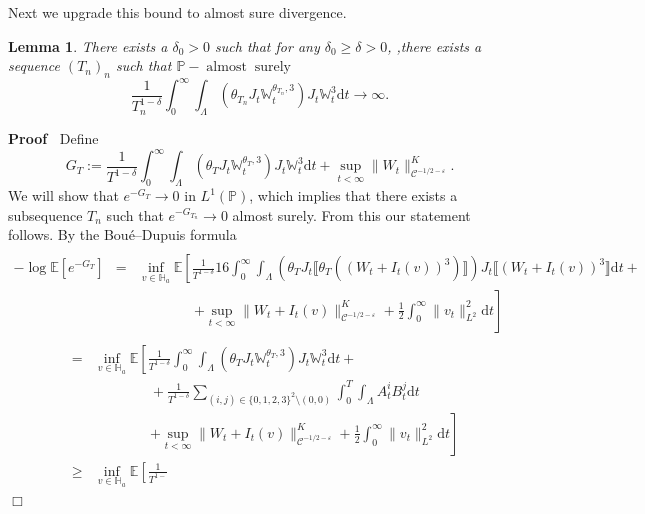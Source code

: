 \documentclass[11pt]{article}
\newcommand{\assign}{:=}
\newcommand{\mathd}{\mathrm{d}}
\newcommand{\tmop}[1]{\ensuremath{\operatorname{#1}}}
\newenvironment{proof}{\noindent\textbf{Proof\ }}{\hspace*{\fill}$\Box$\medskip}
\newtheorem{lemma}{Lemma}
\newcommand{\VV}{\mathscr{C}}
\begin{document}
Next we upgrade this bound to almost sure divergence.

\begin{lemma}
  There exists a $\delta_0 > 0$ such that for any $\delta_0 \geqslant \delta >
  0$, ,there exists a sequence $(T_n)_n$ such that $\mathbb{P}- \tmop{almost}
  \tmop{surely}$
  \[ \frac{1}{T_n^{1 - \delta}} \int^{\infty}_0 \int_{\Lambda} \left(
     \theta_{T_n} J_t \mathbb{W}_t^{\theta_{T_n}, 3} \right) J_t
     \mathbb{W}_t^3 \mathd t \rightarrow \infty . \]
\end{lemma}

\begin{proof}
  Define
  \[ G_T \assign \frac{1}{T^{1 - \delta}} \int^{\infty}_0 \int_{\Lambda}
     (\theta_T J_t \mathbb{W}_t^{\theta_T, 3}) J_t \mathbb{W}_t^3 \mathd t +
     \sup_{t < \infty} \| W_t \|^K_{\VV^{- 1 / 2 - \varepsilon}} . \]
  We will show that $e^{- G_T} \rightarrow 0$ in $L^1 (\mathbb{P})$, which
  implies that there exists a subsequence $T_n$ such that $e^{- G_{T_n}}
  \rightarrow 0$ almost surely. From this our statement follows. By the
  Bou{\'e}--Dupuis formula
    \begin{eqnarray*}
    &  & \\
    - \log \mathbb{E} [e^{- G_T}] & = & \inf_{v \in \mathbb{H}_a} \mathbb{E}
    \left[ \frac{1}{T^{1 - \delta}} 16 \int^{\infty}_0 \int_{\Lambda}
    (\theta_T J_t \llbracket \theta_T ((W_t + I_t (v))^3) \rrbracket) J_t
    \llbracket (W_t + I_t (v))^3 \rrbracket \mathd t + \right.\\
    &  & \qquad \qquad \left. + \sup_{t < \infty} \| W_t + I_t (v)
    \|^K_{\VV^{- 1 / 2 - \varepsilon}} + \frac{1}{2} \int^{\infty}_0 \| v_t
    \|^2_{L^2} \mathd t \right]\\
  \end{eqnarray*}
  \begin{eqnarray*}
    & = & \inf_{v \in \mathbb{H}_a} \mathbb{E} \left[ \frac{1}{T^{1 -
    \delta}} \int^{\infty}_0 \int_{\Lambda} (\theta_T J_t
    \mathbb{W}_t^{\theta_T, 3}) J_t \mathbb{W}_t^3 \mathd t \right. +\\
    &  & \qquad \qquad + \frac{1}{T^{1 - \delta}} \sum_{(i, j) \in \{ 0, 1,
    2, 3 \}^2 \setminus (0, 0)} \int^T_0 \int_{\Lambda} A_t^i B_t^j \mathd t\\
    &  & \qquad \qquad \left. + \sup_{t < \infty} \| W_t + I_t (v)
    \|^K_{\VV^{- 1 / 2 - \varepsilon}} + \frac{1}{2} \int^{\infty}_0 \| v_t
    \|^2_{L^2} \mathd t \right]\\
    & \geqslant & \inf_{v \in \mathbb{H}_a} \mathbb{E} \left[ \frac{1}{T^{1 -
}}
\end{eqnarray*}
\end{proof}
\end{document}
